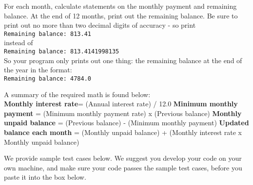 \documentclass{article}
\begin{document}
  For each month, calculate statements on the monthly payment and remaining
  balance. At the end of 12 months, print out the remaining balance. Be sure to
  print out no more than two decimal digits of accuracy - so print\\
  \verb|Remaining balance: 813.41|\\
  instead of\\
  \verb|Remaining balance: 813.4141998135|\\
  So your program only prints out one thing: the remaining balance at the end of
  the year in the format:\\
  \verb|Remaining balance: 4784.0|

  A summary of the required math is found below:\\
  \textbf{Monthly interest rate}= (Annual interest rate) / 12.0
  \textbf{Minimum monthly payment} = (Minimum monthly payment rate) x (Previous balance)
  \textbf{Monthly unpaid balance} = (Previous balance) - (Minimum monthly payment)
  \textbf{Updated balance each month} = (Monthly unpaid balance) + (Monthly interest rate
  x Monthly unpaid balance)

  We provide sample test cases below. We suggest you develop your code on your
  own machine, and make sure your code passes the sample test cases, before you
  paste it into the box below.

  \subsection*{}
\end{document}
